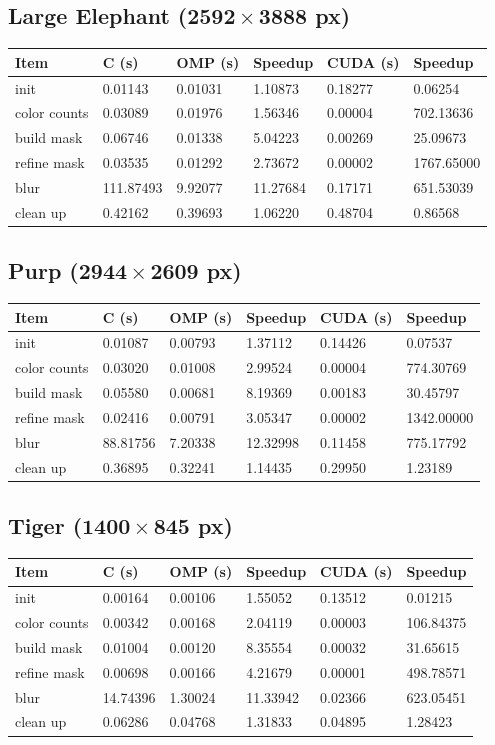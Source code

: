 \documentclass[12pt]{article}
\begin{document}
\subsection{Large Elephant ($\mathbf{2592 \times 3888}$ px)}

\begin{tabular}{l|l|l|l|l|l}
    Item & C (s) & OMP (s) & Speedup & CUDA (s) & Speedup
\\  \hline
    init & 0.01143 & 0.01031 & 1.10873 & 0.18277 & 0.06254
\\  color counts & 0.03089 & 0.01976 & 1.56346 & 0.00004 & 702.13636
\\  build mask & 0.06746 & 0.01338 & 5.04223 & 0.00269 & 25.09673
\\  refine mask & 0.03535 & 0.01292 & 2.73672 & 0.00002 & 1767.65000
\\  blur & 111.87493 & 9.92077 & 11.27684 & 0.17171 & 651.53039
\\  clean up & 0.42162 & 0.39693 & 1.06220 & 0.48704 & 0.86568
\end{tabular}

\subsection{Purp ($\mathbf{2944 \times 2609}$ px)}

\begin{tabular}{l|l|l|l|l|l}
    Item & C (s) & OMP (s) & Speedup & CUDA (s) & Speedup
\\  \hline
    init & 0.01087 & 0.00793 & 1.37112 & 0.14426 & 0.07537
\\  color counts & 0.03020 & 0.01008 & 2.99524 & 0.00004 & 774.30769
\\  build mask & 0.05580 & 0.00681 & 8.19369 & 0.00183 & 30.45797
\\  refine mask & 0.02416 & 0.00791 & 3.05347 & 0.00002 & 1342.00000
\\  blur & 88.81756 & 7.20338 & 12.32998 & 0.11458 & 775.17792
\\  clean up & 0.36895 & 0.32241 & 1.14435 & 0.29950 & 1.23189
\end{tabular}

\subsection{Tiger ($\mathbf{1400 \times 845}$ px)}

\begin{tabular}{l|l|l|l|l|l}
    Item & C (s) & OMP (s) & Speedup & CUDA (s) & Speedup
\\  \hline
    init & 0.00164 & 0.00106 & 1.55052 & 0.13512 & 0.01215
\\  color counts & 0.00342 & 0.00168 & 2.04119 & 0.00003 & 106.84375
\\  build mask & 0.01004 & 0.00120 & 8.35554 & 0.00032 & 31.65615
\\  refine mask & 0.00698 & 0.00166 & 4.21679 & 0.00001 & 498.78571
\\  blur & 14.74396 & 1.30024 & 11.33942 & 0.02366 & 623.05451
\\  clean up & 0.06286 & 0.04768 & 1.31833 & 0.04895 & 1.28423
\end{tabular}
\end{document}
